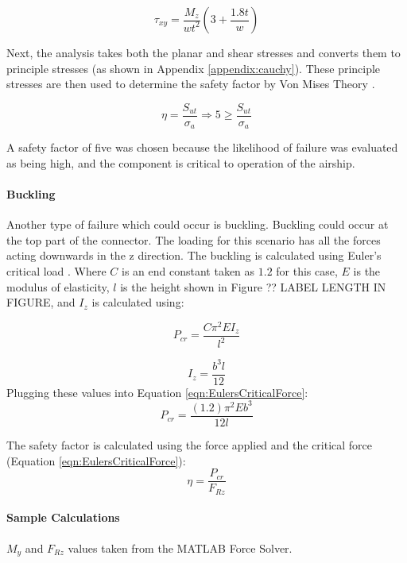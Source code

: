 \documentclass[../main.tex]{subfiles}
\begin{document}
\begin{equation} \label{eqn:armtorsionShear}
\tau_{xy} = \dfrac{M_{z}}{wt^2}(3+\frac{1.8t}{w})
\end{equation}

Next, the analysis takes both the planar and shear stresses and converts them to principle stresses (as shown in Appendix \ref{appendix:cauchy}). These principle stresses are then used to determine the safety factor by Von Mises Theory \cite[221]{shigley}.

\begin{equation}
\eta = \dfrac{S_{ut}}{\sigma _a} \Rightarrow 5 \geq \dfrac{S_{ut}}{\sigma _a}
\end{equation}

A safety factor of five was chosen because the likelihood of failure was evaluated as being high, and the component is critical to operation of the airship.

\paragraph*{Buckling}
Another type of failure which could occur is buckling. Buckling could occur at the top part of the connector. The loading for this scenario has all the forces acting downwards in the z direction. The buckling is calculated using Euler's critical load \cite[178]{shigley}. Where $C$ is an end constant taken as $1.2$ for this case, $E$ is the modulus of elasticity, $l$ is the height shown in Figure ?? LABEL LENGTH IN FIGURE, and $I_z$ is calculated using: 

\begin{equation} \label{eqn:EulersCriticalForce}
P_{cr} = \frac{C\pi^2EI_z}{l^2}
\end{equation}

\begin{equation}
I_z = \frac{b^3l}{12}
\end{equation}
Plugging these values into Equation \ref{eqn:EulersCriticalForce}:
\begin{equation}
P_{cr} = \frac{(1.2)\pi^2Eb^3}{12l}
\end{equation}

The safety factor is calculated using the force applied and the critical force (Equation \ref{eqn:EulersCriticalForce}):
\begin{equation}
\eta = \frac{P_{cr}}{F_{Rz}}
\end{equation}

\paragraph*{Sample Calculations}
$M_y$ and $F_{Rz}$ values taken from the MATLAB Force Solver.
\end{document}
